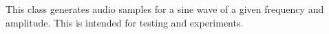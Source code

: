 This class generates audio samples for a sine wave of a 
given frequency and amplitude. This is intended for testing
and experiments.